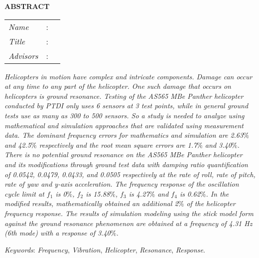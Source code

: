 \thispagestyle{newchap}
\begin{center}
  \large\textbf{ABSTRACT}
\end{center}


\vspace{2ex}

\begingroup
\setlength{\tabcolsep}{0pt}

\noindent
\begin{tabularx}{\textwidth}{l >{\centering}m{3em} X}
  \emph{Name}     & : & \name{}         \\

  \emph{Title}    & : & \engtatitle{}   \\

  \emph{Advisors} & : & \advisor{}   \\
  
\end{tabularx}
\endgroup

\emph{Helicopters in motion have complex and intricate components. Damage can occur at any time to any part of the helicopter. One such damage that occurs on helicopters is ground resonance. Testing of the AS565 MBe Panther helicopter conducted by PTDI only uses 6 sensors at 3 test points, while in general ground tests use as many as 300 to 500 sensors. So a study is needed to analyze using mathematical and simulation approaches that are validated using measurement data. The dominant frequency errors for mathematics and simulation are 2.63$\%$ and 42.5$\%$ respectively and the root mean square errors are 1.7$\%$ and 3.40$\%$. There is no potential ground resonance on the AS565 MBe Panther helicopter and its modifications through ground test data with damping ratio quantification of 0.0542, 0.0479, 0.0433, and 0.0505 respectively at the rate of roll, rate of pitch, rate of yaw and y-axis acceleration. The frequency response of the oscillation cycle limit at $f_1$ is 0$\%$, $f_2$ is 15.88$\%$, $f_3$ is 4.27$\%$ and $f_4$ is 0.62$\%$. In the modified results, mathematically obtained an additional 2$\%$ of the helicopter frequency response. The results of simulation modeling using the stick model form against the ground resonance phenomenon are obtained at a frequency of 4.31 Hz (6th mode) with a response of 3.40$\%$.}

\emph{Keywords}: \emph{Frequency}, \emph{Vibration}, \emph{Helicopter}, \emph{Resonance}, \emph{Response}.
